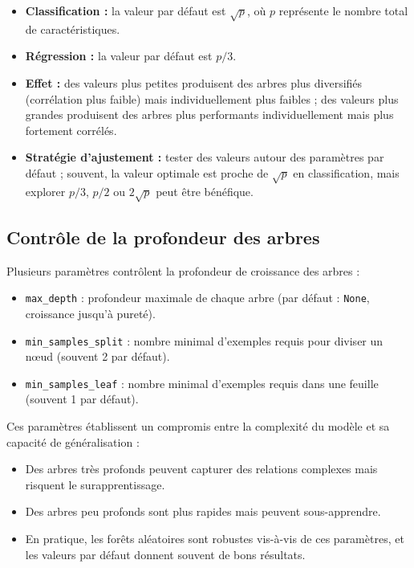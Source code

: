 \begin{itemize}
    \item \textbf{Classification :} la valeur par défaut est $\sqrt{p}$, où $p$ représente le nombre total de caractéristiques.
    \item \textbf{Régression :} la valeur par défaut est $p/3$.
    \item \textbf{Effet :} des valeurs plus petites produisent des arbres plus diversifiés (corrélation plus faible) mais individuellement plus faibles ; des valeurs plus grandes produisent des arbres plus performants individuellement mais plus fortement corrélés.
    \item \textbf{Stratégie d’ajustement :} tester des valeurs autour des paramètres par défaut ; souvent, la valeur optimale est proche de $\sqrt{p}$ en classification, mais explorer $p/3$, $p/2$ ou $2\sqrt{p}$ peut être bénéfique.
\end{itemize}

\subsection{Contrôle de la profondeur des arbres}

Plusieurs paramètres contrôlent la profondeur de croissance des arbres :

\begin{itemize}
    \item \texttt{max\_depth} : profondeur maximale de chaque arbre (par défaut : \texttt{None}, croissance jusqu’à pureté).
    \item \texttt{min\_samples\_split} : nombre minimal d’exemples requis pour diviser un nœud (souvent 2 par défaut).
    \item \texttt{min\_samples\_leaf} : nombre minimal d’exemples requis dans une feuille (souvent 1 par défaut).
\end{itemize}

Ces paramètres établissent un compromis entre la complexité du modèle et sa capacité de généralisation :

\begin{itemize}
    \item Des arbres très profonds peuvent capturer des relations complexes mais risquent le surapprentissage.
    \item Des arbres peu profonds sont plus rapides mais peuvent sous-apprendre.
    \item En pratique, les forêts aléatoires sont robustes vis-à-vis de ces paramètres, et les valeurs par défaut donnent souvent de bons résultats.
\end{itemize}

